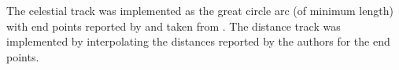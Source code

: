 The celestial track was implemented as the great circle arc (of minimum length) with end points reported by \citet{Riley2020} and taken from \citet{Lauchner2006}. The distance track was implemented by interpolating the distances reported by the authors for the end points.  
